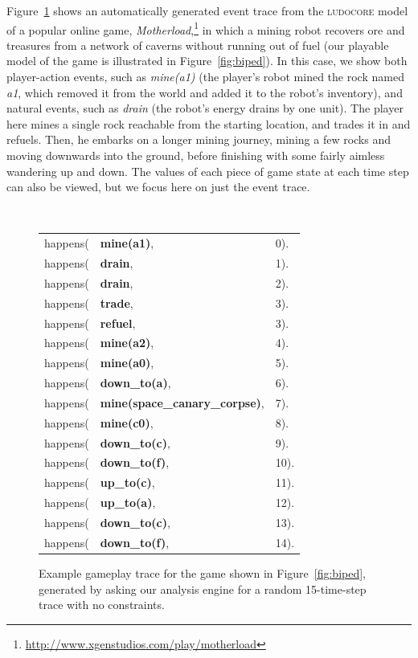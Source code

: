 \documentclass[conference]{IEEEtran}
\newcommand{\ludocore}{\textsc{ludocore}}
\begin{document}
Figure~\ref{fig:trace} shows an automatically generated event trace from the
\ludocore{} model of a popular online game,
\emph{Motherload},\footnote{\url{http://www.xgenstudios.com/play/motherload}}
in which a mining robot recovers ore and treasures from a network of caverns
without running out of fuel (our playable model of the game is illustrated in
Figure~\ref{fig:biped}). In this case, we show both player-action events, such
as \emph{mine(a1)} (the player's robot mined the rock named \emph{a1}, which
removed it from the world and added it to the robot's inventory), and natural
events, such as \emph{drain} (the robot's energy drains by one unit). The player
here mines a single rock reachable from the starting location, and trades it in
and refuels. Then, he embarks on a longer mining journey, mining a few rocks and
moving downwards into the ground, before finishing with some fairly aimless
wandering up and down.  The values of each piece of game state at each time
step can also be viewed, but we focus here on just the event trace.

\begin{figure}
\parbox{\columnwidth}{\tt
\begin{tabular}{rll}
happens(&\textbf{mine(a1)},&0).\\
happens(&\textbf{drain},&1).\\
happens(&\textbf{drain},&2).\\
happens(&\textbf{trade},&3).\\
happens(&\textbf{refuel},&3).\\
happens(&\textbf{mine(a2)},&4).\\
happens(&\textbf{mine(a0)},&5).\\
happens(&\textbf{down\_to(a)},&6).\\
happens(&\textbf{mine(space\_canary\_corpse)},&7).\\
happens(&\textbf{mine(c0)},&8).\\
happens(&\textbf{down\_to(c)},&9).\\
happens(&\textbf{down\_to(f)},&10).\\
happens(&\textbf{up\_to(c)},&11).\\
happens(&\textbf{up\_to(a)},&12).\\
happens(&\textbf{down\_to(c)},&13).\\
happens(&\textbf{down\_to(f)},&14).
\end{tabular}}
\caption{Example gameplay trace for the game shown in Figure~\ref{fig:biped},
generated by asking our analysis engine for a random 15-time-step trace with no
constraints.}
\label{fig:trace}
\end{figure}
\end{document}
